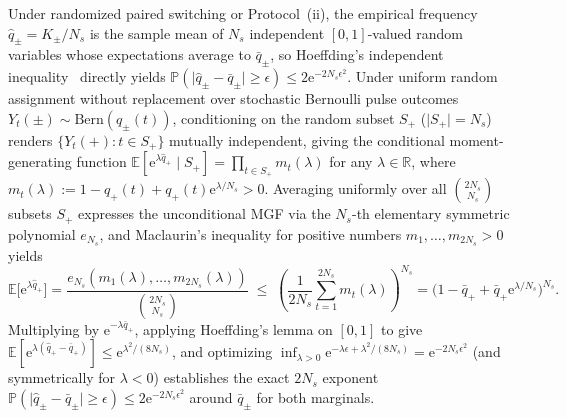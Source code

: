 \documentclass{iopjournal}
\newcommand{\abs}[1]{\lvert #1\rvert}
\newcommand{\ee}{\mathrm{e}}
\begin{document}
Under randomized paired switching or Protocol~(ii), the empirical frequency $\widehat q_\pm = K_\pm/N_s$ is the sample mean of $N_s$ independent $[0,1]$-valued random variables whose expectations average to $\bar q_\pm$, so Hoeffding's independent inequality~\cite{Hoeffding1963} directly yields $\mathbb{P}(\abs{\widehat q_\pm - \bar q_\pm} \ge \epsilon) \le 2\ee^{-2N_s\epsilon^2}$. Under uniform random assignment without replacement over stochastic Bernoulli pulse outcomes $Y_t(\pm) \sim \mathrm{Bern}(q_\pm(t))$, conditioning on the random subset $S_+$ ($\abs{S_+} = N_s$) renders $\{Y_t(+) : t \in S_+\}$ mutually independent, giving the conditional moment-generating function $\mathbb{E}[\ee^{\lambda\widehat q_+} \mid S_+] = \prod_{t \in S_+} m_t(\lambda)$ for any $\lambda \in \mathbb{R}$, where $m_t(\lambda) := 1 - q_+(t) + q_+(t)\ee^{\lambda/N_s} > 0$. Averaging uniformly over all $\binom{2N_s}{N_s}$ subsets $S_+$ expresses the unconditional MGF via the $N_s$-th elementary symmetric polynomial $e_{N_s}$, and Maclaurin's inequality for positive numbers $m_1,\dots,m_{2N_s} > 0$ yields
\begin{equation}\label{eq:maclaurin-mgf}
\mathbb{E}\bigl[\ee^{\lambda\widehat q_+}\bigr] = \frac{e_{N_s}(m_1(\lambda),\dots,m_{2N_s}(\lambda))}{\binom{2N_s}{N_s}} \;\le\; \left(\frac{1}{2N_s}\sum_{t=1}^{2N_s} m_t(\lambda)\right)^{\!N_s} = \bigl(1 - \bar q_+ + \bar q_+\ee^{\lambda/N_s}\bigr)^{N_s}.
\end{equation}
Multiplying by $\ee^{-\lambda\bar q_+}$, applying Hoeffding's lemma on $[0,1]$ to give $\mathbb{E}[\ee^{\lambda(\widehat q_+ - \bar q_+)}] \le \ee^{\lambda^2/(8N_s)}$, and optimizing $\inf_{\lambda > 0}\ee^{-\lambda\epsilon + \lambda^2/(8N_s)} = \ee^{-2N_s\epsilon^2}$ (and symmetrically for $\lambda < 0$) establishes the exact $2N_s$ exponent $\mathbb{P}(\abs{\widehat q_\pm - \bar q_\pm} \ge \epsilon) \le 2\ee^{-2N_s\epsilon^2}$ around $\bar q_\pm$ for both marginals.
\end{document}
